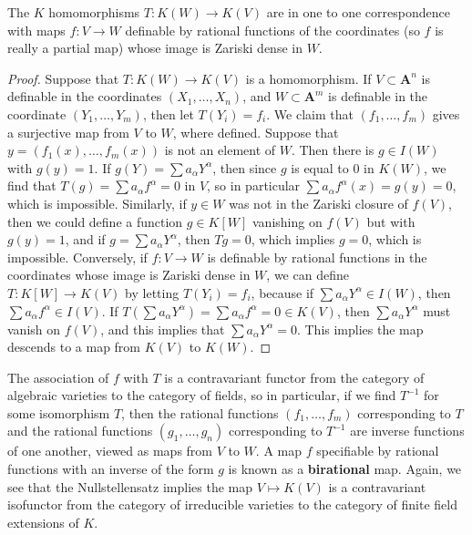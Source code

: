 \begin{theorem}
    The $K$ homomorphisms $T: K(W) \to K(V)$ are in one to one correspondence with maps $f: V \to W$ definable by rational functions of the coordinates (so $f$ is really a partial map) whose image is Zariski dense in $W$.
\end{theorem}
\begin{proof}
    Suppose that $T: K(W) \to K(V)$ is a homomorphism. If $V \subset \mathbf{A}^n$ is definable in the coordinates $(X_1, \dots, X_n)$, and $W \subset \mathbf{A}^m$ is definable in the coordinate $(Y_1, \dots, Y_m)$, then let $T(Y_i) = f_i$. We claim that $(f_1, \dots, f_m)$ gives a surjective map from $V$ to $W$, where defined. Suppose that $y = (f_1(x), \dots, f_m(x))$ is not an element of $W$. Then there is $g \in I(W)$ with $g(y) = 1$. If $g(Y) = \sum a_\alpha Y^\alpha$, then since $g$ is equal to 0 in $K(W)$, we find that $T(g) = \sum a_\alpha f^\alpha = 0$ in $V$, so in particular $\sum a_\alpha f^\alpha(x) = g(y) = 0$, which is impossible. Similarly, if $y \in W$ was not in the Zariski closure of $f(V)$, then we could define a function $g \in K[W]$ vanishing on $f(V)$ but with $g(y) = 1$, and if $g = \sum a_\alpha Y^\alpha$, then $Tg = 0$, which implies $g = 0$, which is impossible. Conversely, if $f: V \to W$ is definable by rational functions in the coordinates whose image is Zariski dense in $W$, we can define $T: K[W] \to K(V)$ by letting $T(Y_i) = f_i$, because if $\sum a_\alpha Y^\alpha \in I(W)$, then $\sum a_\alpha f^\alpha \in I(V)$. If $T(\sum a_\alpha Y^\alpha) = \sum a_\alpha f^\alpha = 0 \in K(V)$, then $\sum a_\alpha Y^\alpha$ must vanish on $f(V)$, and this implies that $\sum a_\alpha Y^\alpha = 0$. This implies the map descends to a map from $K(V)$ to $K(W)$.
\end{proof}

The association of $f$ with $T$ is a contravariant functor from the category of algebraic varieties to the category of fields, so in particular, if we find $T^{-1}$ for some isomorphism $T$, then the rational functions $(f_1, \dots, f_m)$ corresponding to $T$ and the rational functions $(g_1, \dots, g_n)$ corresponding to $T^{-1}$ are inverse functions of one another, viewed as maps from $V$ to $W$. A map $f$ specifiable by rational functions with an inverse of the form $g$ is known as a {\bf birational} map. Again, we see that the Nullstellensatz implies the map $V \mapsto K(V)$ is a contravariant isofunctor from the category of irreducible varieties to the category of finite field extensions of $K$.

